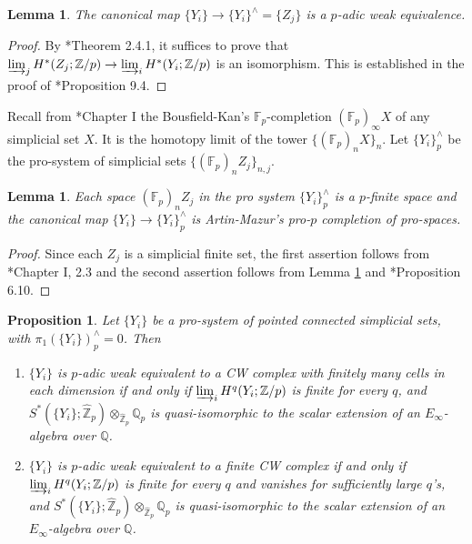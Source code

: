 \documentclass[11pt]{amsart}
\newtheorem{proposition}[theorem]{Proposition}
\newtheorem{lemma}[theorem]{Lemma}
\theoremstyle{definition}
\numberwithin{equation}{section}
\numberwithin{equation}{section}
\newcommand\QQ{\mathbb{Q}}
\newcommand\ZZ{\mathbb{Z}}
\newcommand\FF{\mathbb{F}}
\begin{document}
\begin{lemma}\label{Lem: naive profinite completion of simplicial sets}
The canonical map $\{Y_i\}\rightarrow \{Y_i\}^{\wedge}=\{Z_j\}$ is a $p$-adic weak equivalence.
\end{lemma}

\begin{proof}
By \cite{Morel-p-adic-spaces}*{Theorem 2.4.1}, it suffices to prove that $\varinjlim_j H^*(Z_j;\ZZ/p)\rightarrow \varinjlim_i H^*(Y_i;\ZZ/p)$ is an isomorphism. This is established in the proof of \cite{Isaksen-model-category-of-pro-spaces}*{Proposition 9.4}.
\end{proof}

Recall from \cite{Bousfield-Kan-homotopy-limits-completions-localizations}*{Chapter I} the Bousfield-Kan's $\FF_p$-completion $(\FF_p)_{\infty} X$ of any simplicial set $X$. It is the homotopy limit of the tower $\{(\FF_p)_{n} X\}_n$. Let $\{Y_i\}^{\wedge}_p$ be the pro-system of simplicial sets $\{(\FF_p)_{n} Z_j\}_{n,j}$.

\begin{lemma}\label{Lem: definition of pro-p completion of a pro simplicial set}
Each space $(\FF_p)_{n} Z_j$ in the pro system $\{Y_i\}^{\wedge}_p$ is a $p$-finite space and the canonical map $\{Y_i\}\rightarrow \{Y_i\}^{\wedge}_p$ is Artin-Mazur's pro-$p$ completion of pro-spaces. 
\end{lemma}

\begin{proof}
Since each $Z_j$ is a simplicial finite set, the first assertion follows from \cite{Bousfield-Kan-homotopy-limits-completions-localizations}*{Chapter I, 2.3} and the second assertion follows from Lemma \ref{Lem: naive profinite completion of simplicial sets} and \cite{Friedlander-etale-homotopy}*{Proposition 6.10}. 
\end{proof}

\begin{proposition}\label{Prop: liftings of simply connected p-complete finite type pro-spaces}
Let $\{Y_i\}$ be a pro-system of pointed connected simplicial sets, with $\pi_1(\{Y_i\})^{\wedge}_p=0$. Then 
\begin{enumerate}[leftmargin=0.25in]
    \item $\{Y_i\}$ is $p$-adic weak equivalent to a CW complex with finitely many cells in each dimension if and only if $\varinjlim_i H^q(Y_i;\ZZ/p)$ is finite for every $q$, and $S^*(\{Y_i\};\widehat{\ZZ}_p)\otimes_{\widehat{\ZZ}_p} \QQ_p$ is quasi-isomorphic to the scalar extension of an $E_{\infty}$-algebra over $\QQ$.
    \item $\{Y_i\}$ is $p$-adic weak equivalent to a finite CW complex if and only if $\varinjlim_i H^q(Y_i;\ZZ/p)$ is finite for every $q$ and vanishes for sufficiently large $q$'s, and $S^*(\{Y_i\};\widehat{\ZZ}_p)\otimes_{\widehat{\ZZ}_p} \QQ_p$  is quasi-isomorphic to the scalar extension of an $E_{\infty}$-algebra over $\QQ$.
\end{enumerate}
\end{proposition}
\end{document}
